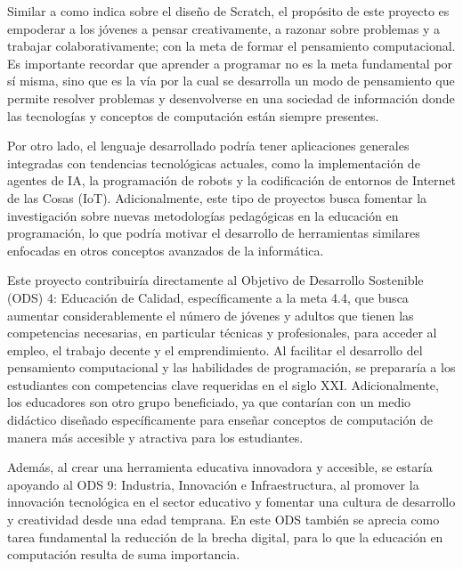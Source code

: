 Similar a como indica  sobre el diseño de Scratch, el propósito de este proyecto es empoderar a los jóvenes a pensar creativamente, a razonar sobre problemas y a trabajar colaborativamente; con la meta de formar el pensamiento computacional. Es importante recordar que aprender a programar no es la meta fundamental por sí misma, sino que es la vía por la cual se desarrolla un modo de pensamiento que permite resolver problemas y desenvolverse en una sociedad de información donde las tecnologías y conceptos de computación están siempre presentes.

Por otro lado, el lenguaje desarrollado podría tener aplicaciones generales integradas con tendencias tecnológicas actuales, como la implementación de agentes de IA, la programación de robots y la codificación de entornos de Internet de las Cosas (IoT). Adicionalmente, este tipo de proyectos busca fomentar la investigación sobre nuevas metodologías pedagógicas en la educación en programación, lo que podría motivar el desarrollo de herramientas similares enfocadas en otros conceptos avanzados de la informática.

Este proyecto contribuiría directamente al Objetivo de Desarrollo Sostenible (ODS) 4: Educación de Calidad, específicamente a la meta 4.4, que busca aumentar considerablemente el número de jóvenes y adultos que tienen las competencias necesarias, en particular técnicas y profesionales, para acceder al empleo, el trabajo decente y el emprendimiento. Al facilitar el desarrollo del pensamiento computacional y las habilidades de programación, se prepararía a los estudiantes con competencias clave requeridas en el siglo XXI. Adicionalmente, los educadores son otro grupo beneficiado, ya que contarían con un medio didáctico diseñado específicamente para enseñar conceptos de computación de manera más accesible y atractiva para los estudiantes.

Además, al crear una herramienta educativa innovadora y accesible, se estaría apoyando al ODS 9: Industria, Innovación e Infraestructura, al promover la innovación tecnológica en el sector educativo y fomentar una cultura de desarrollo y creatividad desde una edad temprana. En este ODS también se aprecia como tarea fundamental la reducción de la brecha digital, para lo que la educación en computación resulta de suma importancia.